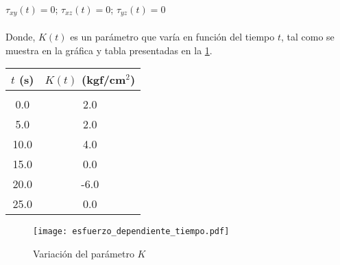 \documentclass[../notas medios.tex]{subfiles}
\begin{document}
\begin{enumerate}
	\hspace*{10mm} $ \tau_{xy} (t) = 0$; \hspace*{5mm} $\tau_{xz} (t) = 0$; \hspace*{5mm} $\tau_{yz} (t) = 0$ \\
\\	
Donde, $K(t)$ es un par\'ametro que var\'ia en funci\'on del tiempo $t$, tal como se muestra en la gráfica y tabla presentadas en la \cref{fig:esfuerzo_dependiente_tiempo}.
\begin{minipage}{0.3\textwidth}
\begin{tabular}{cc}
$t$ (s) & $K(t)$ (kgf/cm$^2$) \\ 
\hline\\
0.0 & 2.0 \\ 
5.0 & 2.0 \\ 
10.0 & 4.0 \\ 
15.0 & 0.0 \\ 
20.0 & -6.0 \\  
25.0 & 0.0\\
\end{tabular} 
\end{minipage}
\begin{minipage}{0.6\textwidth}
\begin{figure}[H]
  \centering
  \texttt{[image: esfuerzo\_dependiente\_tiempo.pdf]} 	
  \caption{Variación del parámetro $K$}
  \label{fig:esfuerzo_dependiente_tiempo}
\end{figure}
\end{minipage}



\end{enumerate}
\end{document}
